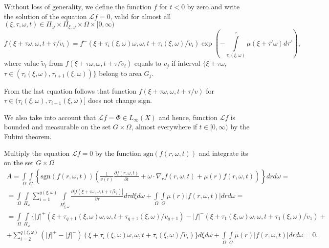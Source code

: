 \documentclass[12pt,reqno]{report}
\def\sgn{\mathrm{sgn}}
\begin{document}
Without loss of generality, we define the function $f$ for $t < 0$ by zero and write 
the solution of the equation ${\mathcal L} f = 0$, valid for almost all $(\xi,\tau,\omega,t) \in \Pi_{\omega} \times
\Pi_{\xi,\omega} \times \Omega \times [0,\infty)$
$$
f(\xi+\tau\omega,\omega,t+\tau/\tilde{v}_i)=f^-(\xi+\tau_i (\xi,\omega)
\omega,\omega, t+\tau_i (\xi,\omega)/\tilde{v}_i) \exp \left ( - \int
\limits^{\tau}_{\tau_i(\xi,\omega)} \mu(\xi+\tau'\omega) d\tau'
\right ),
$$
where value $\tilde{v}_i$ from $f(\xi+\tau\omega,\omega,t+\tau/\tilde{v}_i)$ equals to $v_j$ if interval $\{\xi+\tau\omega$, $\tau\in (\tau_i(\xi,\omega), \tau_{i+1}(\xi,\omega))\}$ belong to area $G_j$. 

From the last equation follows that function
$f(\xi+\tau\omega,\omega,t+\tau/v)$ for $\tau \in
(\tau_i(\xi,\omega), \tau_{i+1}(\xi,\omega)]$ does not change sign.

We also take into account that ${\mathcal L f} = \Phi \in L_{\infty}(X)$ and hence, 
function ${\mathcal L f}$ is bounded and measurable on the set $G\times \Omega$, almost everywhere if $t\in[0,\infty)$ 
by the Fubini theorem.

Multiply the equation ${\mathcal L}f=0$ by the function $ {\sgn}
(f(r,\omega,t))$ and integrate its on the set $G\times \Omega$
\begin{multline}
A=\int \limits_{\Omega} \int \limits_G \left \{ {\sgn}
(f(r,\omega,t))\left(\frac{1}{v(r)} \frac{\partial
	f(r,\omega,t)}{\partial t} +\omega \cdot \nabla_r f(r,\omega,t) +
\mu (r) f(r,\omega,t)\right)\right \}
dr d\omega=
\\
= \int \limits_{\Omega} \int \limits_{\Pi_{\omega}} \sum
\limits^{q(\xi,\omega)}_{i=1} \int \limits_{\Pi^i_{\xi,\omega}}
\frac{\partial |f(\xi+\tau\omega,\omega,t+\tau/\tilde{v}_i)|}{\partial \tau}
d\tau d \xi d \omega +\int \limits_{\Omega} \int \limits_G \mu (r)
|f(r,\omega,t)|
dr d\omega= \\
=
\int \limits_{\Omega} \int \limits_{\Pi_{\omega}}\{
|f|^+(\xi+\tau_{q+1}
(\xi,\omega) \omega,\omega,t+\tau_{q+1}(\xi,\omega)/\tilde{v}_{q+1}) -
|f|^-(\xi+\tau_{1} (\xi,\omega) \omega,\omega,t+\tau_{1}(\xi,\omega)/\tilde{v}_{1})
+
\\+
\sum \limits^{q(\xi,\omega)}_{i=2}
(|f|^+ - |f|^-)(\xi+\tau_i (\xi,\omega)
\omega,\omega, t+\tau_i (\xi,\omega)/\tilde{v}_i)\} d\xi d\omega + \int
\limits_{\Omega} \int \limits_G \mu(r) |f(r,\omega,t)| dr d\omega
= 0.
\end{multline}
\end{document}
